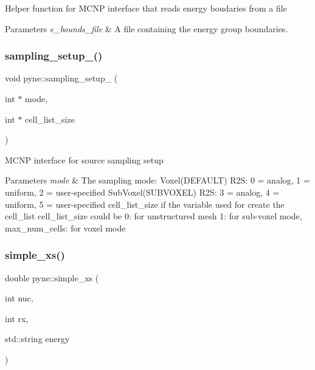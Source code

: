 Helper function for M\+C\+NP interface that reads energy boudaries from a file 
\begin{DoxyParams}{Parameters}
{\em e\+\_\+bounds\+\_\+file} & A file containing the energy group boundaries. \\
\hline
\end{DoxyParams}
\mbox{\label{namespacepyne_a4e0d5dd130728ec7c2bbf6b9189cde4b}} 
\subsubsection{\texorpdfstring{sampling\+\_\+setup\+\_\+()}{sampling\_setup\_()}}
{\footnotesize\ttfamily void pyne\+::sampling\+\_\+setup\+\_\+ (\begin{DoxyParamCaption}\item[{int $\ast$}]{mode,  }\item[{int $\ast$}]{cell\+\_\+list\+\_\+size }\end{DoxyParamCaption})}

M\+C\+NP interface for source sampling setup 
\begin{DoxyParams}{Parameters}
{\em mode} & The sampling mode\+: Voxel(\+D\+E\+F\+A\+U\+L\+T) R2S\+: 0 = analog, 1 = uniform, 2 = user-\/specified Sub\+Voxel(\+S\+U\+B\+V\+O\+X\+E\+L) R2S\+: 3 = analog, 4 = uniform, 5 = user-\/specified cell\+\_\+list\+\_\+size if the variable used for create the cell\+\_\+list cell\+\_\+list\+\_\+size could be 0\+: for unstructured mesh 1\+: for sub-\/voxel mode, max\+\_\+num\+\_\+cells\+: for voxel mode \\
\hline
\end{DoxyParams}
\mbox{\label{namespacepyne_abde9d0cbfe70fd1a75a7cb2d1f59e1f1}} 
\subsubsection{\texorpdfstring{simple\+\_\+xs()}{simple\_xs()}\hspace{0.1cm}{\footnotesize\ttfamily [1/4]}}
{\footnotesize\ttfamily double pyne\+::simple\+\_\+xs (\begin{DoxyParamCaption}\item[{int}]{nuc,  }\item[{int}]{rx,  }\item[{std\+::string}]{energy }\end{DoxyParamCaption})}

